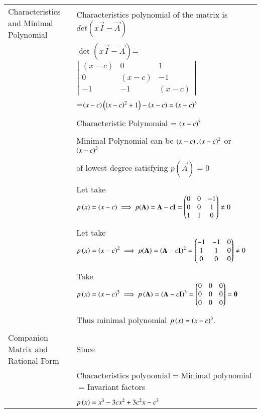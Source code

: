 \documentclass[journal,12pt]{IEEEtran}
\begin{document}
\begin{longtable}{|l|l|}
\multirow{3}{*}{Characteristics and Minimal Polynomial} & \\
&
Characteristics polynomial of the matrix  is $det(x\vec{I}-\vec{A})$\\ 
&\\
& $\det(x\vec{I}-\vec{A})$= $\left|
                \begin{array}{ccc}
                (x-c) & 0 & 1\\
                0 & (x-c) & -1\\
                -1 & -1 & (x-c)
                \end{array} \right|$\\ &=$\left(x-c\right)\left(\left(x-c\right)^2+1\right)-\left(x-c\right)=\left(x-c\right)^3$\\
&\\
& Characteristic Polynomial = $\left(x-c\right)^3$\\
&\\
& Minimal Polynomial can be $\left(x-c\right),\left(x-c\right)^2$ or $\left(x-c\right)^3$ \\
&\\
&of lowest degree satisfying $p(\vec{A})=0$    \\
&\\
&Let take $p\left(x\right)=\left(x-c\right)\implies p(\mathbf{A})=\mathbf{A}-c\mathbf{I}=\begin{pmatrix}0&0&-1\\0&0&1\\1&1&0\end{pmatrix}\neq0$\\
&\\
&Let take $p\left(x\right)=\left(x-c\right)^2\implies p(\mathbf{A})=\left(\mathbf{A}-c\mathbf{I}\right)^2=\begin{pmatrix}-1&-1&0\\1&1&0\\0&0&0\end{pmatrix}\neq0$\\
&\\
&Take $p\left(x\right)=\left(x-c\right)^3\implies p\left(\mathbf{A}\right) =\left(\mathbf{A}-c\mathbf{I}\right)^3=\begin{pmatrix}0&0&0\\0&0&0\\0&0&0\end{pmatrix}=\mathbf{0}$\\
&\\
&Thus minimal polynomial $p\left(x\right)=\left(x-c\right)^3$.\\  
&\\
\hline
\multirow{3}{*}{Companion Matrix and Rational Form} & \\
&Since\\
&\\
&Characteristics polynomial$=$Minimal polynomial$=$Invariant factors\\
&\\
&$p\left(x\right)=x^3-3cx^2+3c^2x-c^3$\\

\end{longtable}
\end{document}
